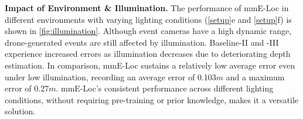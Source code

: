 \textbf{Impact of Environment \& Illumination.}
The performance of mmE-Loc in different environments with varying lighting conditions (\fig \ref{setup}e and \fig \ref{setup}f) is shown in \fig \ref{fig:illumination}. 
Although event cameras have a high dynamic range, drone-generated events are still affected by illumination. 
Baseline-II and -III experience increased errors as illumination decreases due to deteriorating depth estimation. 
In comparison, mmE-Loc sustains a relatively low average error even under low illumination, recording an average error of 0.103$m$ and a maximum error of 0.27$m$.
mmE-Loc's consistent performance across different lighting conditions, without requiring pre-training or prior knowledge, makes it a versatile solution.


